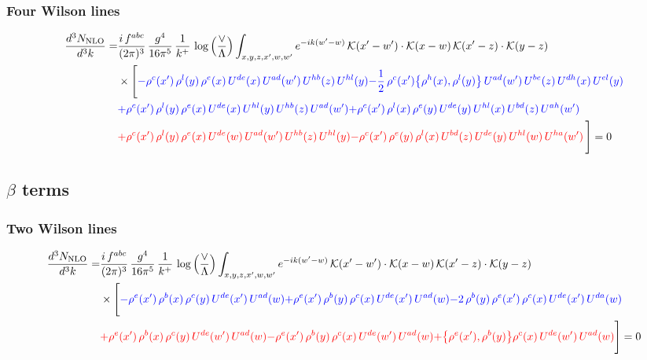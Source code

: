 \documentclass[9pt]{article}
\numberwithin{equation}{section}
\begin{document}
\subsubsection{Four Wilson lines}
\begin{align}
    \frac{d^{3}N_{\rm NLO}}{d^{3}k}= & \frac{i\,f^{abc}}{(2\pi)^{3}}\,\frac{g^{4}}{16\pi^{5}}\,\frac{1}{k^{+}}\,\log\Big(\frac{\vee}{\Lambda}\Big)\int_{x,y,z,x',w,w'}e^{-ik(w'-w)}\,\mathcal{K}(x'-w')\cdot\mathcal{K}(x-w)\,\mathcal{K}(x'-z)\cdot\mathcal{K}(y-z)\notag \\ & \times\Bigg[{\color{blue}-\rho^{c}(x')\,\rho^{l}(y)\,\rho^{e}(x)\,U^{de}(x)\,U^{ad}(w')\,U^{hb}(z)\,U^{hl}(y)}{\color{blue}-\frac{1}{2}\,\rho^{c}(x')\big\{\rho^{h}(x),\rho^{l}(y)\big\}\,U^{ad}(w')\,U^{be}(z)\,U^{dh}(x)\,U^{el}(y)}\notag \\ & {\color{blue}+\rho^{c}(x')\,\rho^{l}(y)\,\rho^{e}(x)\,U^{de}(x)\,U^{hl}(y)\,U^{hb}(z)\,U^{ad}(w')}{\color{blue}+\rho^{c}(x')\,\rho^{l}(x)\,\rho^{e}(y)\,U^{de}(y)\,U^{hl}(x)\,U^{bd}(z)\,U^{ah}(w')}\notag \\ &{\color{red}+\rho^{c}(x')\,\rho^{l}(y)\,\rho^{e}(x)\,U^{de}(w)\,U^{ad}(w')\,U^{hb}(z)\,U^{hl}(y)}{\color{red}-\rho^{c}(x')\,\rho^{e}(y)\,\rho^{l}(x)\,U^{bd}(z)\,U^{de}(y)\,U^{hl}(w)\,U^{ha}(w')}\,\Bigg] = 0
\end{align}
\subsection{$\beta$ terms}
\subsubsection{Two Wilson lines}
\begin{align}
    \frac{d^{3}N_{\rm NLO}}{d^{3}k}= & \frac{i\,f^{abc}}{(2\pi)^{3}}\,\frac{g^{4}}{16\pi^{5}}\,\frac{1}{k^{+}}\,\log\Big(\frac{\vee}{\Lambda}\Big)\int_{x,y,z,x',w,w'}e^{-ik(w'-w)}\,\mathcal{K}(x'-w')\cdot\mathcal{K}(x-w)\,\mathcal{K}(x'-z)\cdot\mathcal{K}(y-z)\notag \\ & \times\Bigg[{\color{blue}-\rho^{e}(x')\,\rho^{b}(x)\,\rho^{c}(y)\,U^{de}(x')\,U^{ad}(w)}{\color{blue}+\rho^{e}(x')\,\rho^{b}(y)\,\rho^{c}(x)\,U^{de}(x')\,U^{ad}(w)}{\color{blue}-2\,\rho^{b}(y)\,\rho^{e}(x')\, \rho^{c}(x)\, U^{de}(x')\,U^{da}(w)}\notag \\ & {\color{red}+\rho^{e}(x')\,\rho^{b}(x)\,\rho^{c}(y)\,U^{de}(w')\,U^{ad}(w)}{\color{red}-\rho^{e}(x')\,\rho^{b}(y)\,\rho^{c}(x)\,U^{de}(w')\,U^{ad}(w)}{\color{red}+\big\{\rho^{e}(x'),\rho^{b}(y)\big\}\rho^{c}(x)\,U^{de}(w')\,U^{ad}(w)}\Bigg] = 0
\end{align}   
\end{document}
